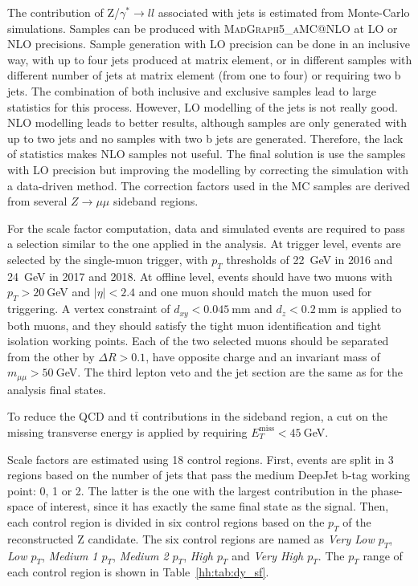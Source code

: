 \documentclass[../main.tex]{subfiles}
\begin{document}
The contribution of Z/$\gamma^*\to ll$ associated with jets is estimated from Monte-Carlo simulations. Samples can be produced with \textsc{MadGraph5\_aMC@NLO} at LO or NLO precisions. Sample generation with LO precision can be done in an inclusive way, with up to four jets produced at matrix element, or in different samples with different number of jets at matrix element (from one to four) or requiring two b jets. The combination of both inclusive and exclusive samples lead to large statistics for this process. However, LO modelling of the jets is not really good. NLO modelling leads to better results, although samples are only generated with up to two jets and no samples with two b jets are generated. Therefore, the lack of statistics makes NLO samples not useful. The final solution is use the samples with LO precision but improving the modelling by correcting the simulation with a data-driven method. The correction factors used in the MC samples are derived from several $Z\to\mu\mu$ sideband regions.

For the scale factor computation, data and simulated events are required to pass a selection similar to the one applied in the analysis. At trigger level, events are selected by the single-muon trigger, with $p_T$ thresholds of 22~GeV in 2016 and 24~GeV in 2017 and 2018. At offline level, events should have two muons with $p_T > 20~$GeV and $|\eta|<2.4$ and one muon should match the muon used for triggering. A vertex constraint of $d_{xy} < 0.045~$mm and $d_z < 0.2~$mm is applied to both muons, and they should satisfy the tight muon identification and tight isolation working points. Each of the two selected muons should be separated from the other by $\Delta R>0.1$, have opposite charge and an invariant mass of $m_{\mu\mu}>50~$GeV. The third lepton veto and the jet section are the same as for the analysis final states.

To reduce the QCD and t$\bar{\text{t}}$ contributions in the sideband region, a cut on the missing transverse energy is applied by requiring $E_T^{\text{miss}} < 45~$GeV.

Scale factors are estimated using 18 control regions. First, events are split in 3 regions based on the number of jets that pass the medium DeepJet b-tag working point: 0, 1 or 2. The latter is the one with the largest contribution in the phase-space of interest, since it has exactly the same final state as the signal. Then, each control region is divided in six control regions based on the $p_T$ of the reconstructed Z candidate. The six control regions are named as \textit{Very Low $p_T$}, \textit{Low $p_T$}, \textit{Medium 1 $p_T$}, \textit{Medium 2 $p_T$}, \textit{High $p_T$} and \textit{Very High $p_T$}. The $p_T$ range of each control region is shown in Table~\ref{hh:tab:dy_sf}.
\end{document}
